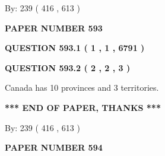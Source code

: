 \documentclass[12pt]{article}
\begin{document}
   
\hspace{1.0in} By: 
 239 ( 416 ,  613 )
   
   
   
   
\newpage 
\setcounter{page}{ 
   593001 } 
   
   
   
   
 {\textbf{ \Large{ PAPER NUMBER  593  }}}
   
   
\vspace{0.2in}
   
   
   
   
   
   
 \vspace{0.2in}
 
 
 
 
   
   
  
\vspace{0.2in}
  
{\textbf{\Large{QUESTION
593.1 
 ( 1 , 1 , 6791 )
}}}
  
  
  
\vspace{0.2in}
  
{\textbf{\Large{QUESTION
593.2 
 ( 2 , 2 , 3 )
}}}
  
  
 
 
\noindent{}
 
 
Canada has 10  provinces and 3 territories.
 
 
 
 
   
   
 \vspace{0.2in}
 
   
   
   
   
\vspace{1.0in} 
{\textbf{\large{ *** END OF PAPER, THANKS *** }}} 
   
   
\hspace{1.0in} By: 
 239 ( 416 ,  613 )
   
   
   
   
\newpage 
\setcounter{page}{ 
   594001 } 
   
   
   
   
 {\textbf{ \Large{ PAPER NUMBER  594  }}}
   
\end{document}
